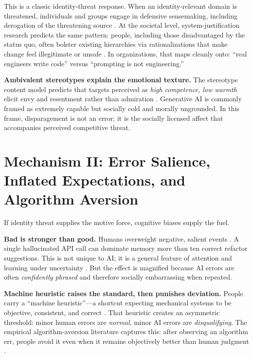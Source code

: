 \documentclass[11pt, a4paper, twocolumn]{article} %
\begin{document}
This is a classic identity-threat response. When an identity-relevant domain is threatened, individuals and groups engage in defensive sensemaking, including derogation of the threatening source \citep{Petriglieri2011UnderThreat}. At the societal level, system-justification research predicts the same pattern: people, including those disadvantaged by the status quo, often bolster existing hierarchies via rationalizations that make change feel illegitimate or unsafe \citep{JostBanaji1994SystemJustification,JostBanajiNosek2004Decade}. In organizations, that maps cleanly onto: ``real engineers write code'' versus ``prompting is not engineering.''

\textbf{Ambivalent stereotypes explain the emotional texture.} The stereotype content model predicts that targets perceived as \emph{high competence, low warmth} elicit envy and resentment rather than admiration \citep{FiskeCuddyGlickXu2002SCM}. Generative AI is commonly framed as extremely capable but socially cold and morally ungrounded. In this frame, disparagement is not an error; it is the socially licensed affect that accompanies perceived competitive threat.

\section*{Mechanism II: Error Salience, Inflated Expectations, and Algorithm Aversion}

If identity threat supplies the motive force, cognitive biases supply the fuel.

\textbf{Bad is stronger than good.} Humans overweight negative, salient events \citep{BaumeisterEtAl2001Bad}. A single hallucinated API call can dominate memory more than ten correct refactor suggestions. This is not unique to AI; it is a general feature of attention and learning under uncertainty \citep{TverskyKahneman1974Heuristics}. But the effect is magnified because AI errors are often \emph{confidently phrased} and therefore socially embarrassing when repeated.

\textbf{Machine heuristic raises the standard, then punishes deviation.} People carry a ``machine heuristic''---a shortcut expecting mechanical systems to be objective, consistent, and correct \citep{YangSundar2024MachineHeuristic}. That heuristic creates an asymmetric threshold: minor human errors are \emph{normal}, minor AI errors are \emph{disqualifying}. The empirical algorithm-aversion literature captures this: after observing an algorithm err, people avoid it even when it remains objectively better than human judgment \citep{DietvorstSimmonsMassey2015Aversion}.
\end{document}

